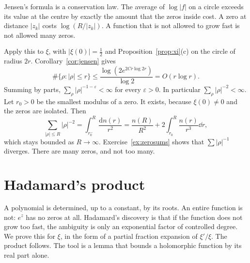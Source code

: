 \begin{beauty}
Jensen's formula is a conservation law. The average of $\log|f|$ on a circle exceeds its value at the centre by exactly the amount that the zeros inside cost. A zero at distance $|z_k|$ costs $\log(R/|z_k|)$. A function that is not allowed to grow fast is not allowed many zeros.
\end{beauty}

Apply this to $\xi$, with $|\xi(0)|=\frac12$ and Proposition~\ref{prop:xi}(c) on the circle of radius $2r$. Corollary~\ref{cor:jensen} gives
\begin{equation}\label{eq:nr}
\#\{\rho:|\rho|\le r\}\le\frac{\log(2e^{2Cr\log2r})}{\log2}=O(r\log r).
\end{equation}
Summing by parts, $\sum_\rho|\rho|^{-1-\varepsilon}<\infty$ for every $\varepsilon>0$. In particular $\sum_\rho|\rho|^{-2}<\infty$. Let $r_0>0$ be the smallest modulus of a zero. It exists, because $\xi(0)\ne0$ and the zeros are isolated. Then
\[
\sum_{|\rho|\le R}|\rho|^{-2}=\int_{r_0^-}^R\frac{\mathrm dn(r)}{r^2}=\frac{n(R)}{R^2}+2\int_{r_0}^R\frac{n(r)}{r^3}\dd r,
\]
which stays bounded as $R\to\infty$. Exercise~\ref{ex:zerosums} shows that $\sum|\rho|^{-1}$ diverges. There are many zeros, and not too many.

\section{Hadamard's product}

A polynomial is determined, up to a constant, by its roots. An entire function is not: $e^z$ has no zeros at all. Hadamard's discovery is that if the function does not grow too fast, the ambiguity is only an exponential factor of controlled degree. We prove this for $\xi$, in the form of a partial fraction expansion of $\xi'/\xi$. The product follows. The tool is a lemma that bounds a holomorphic function by its real part alone.

